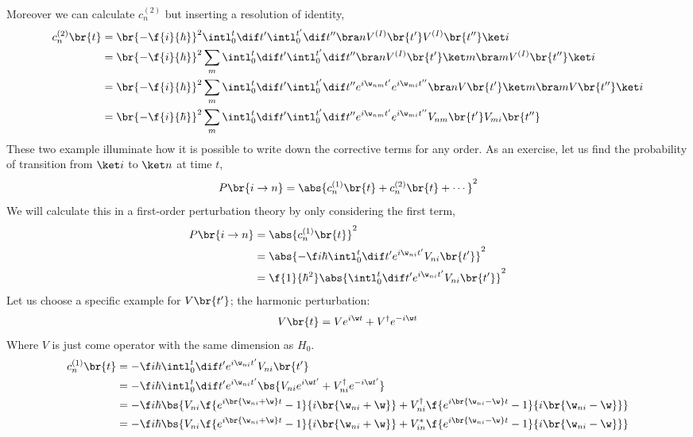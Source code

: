 \documentclass{article}
\begin{document}
Moreover we can calculate $c_n^{(2)}$ but inserting a resolution of identity,
\begin{align*}
    c_n^{(2)}\br{t}
    &= \br{-\f{i}{\hbar}}^2 \intl_{0}^{t} \dif t' \intl_{0}^{t'} \dif t'' \bra n V^{(I)}\br{t'} V^{(I)}\br{t''} \ket i  \\
    &= \br{-\f{i}{\hbar}}^2  \sum_{m}\intl_{0}^{t} \dif t' \intl_{0}^{t'} \dif t'' \bra n V^{(I)}\br{t'} \ket m \bra m V^{(I)}\br{t''} \ket i  \\
    &= \br{-\f{i}{\hbar}}^2  \sum_{m}\intl_{0}^{t} \dif t' \intl_{0}^{t'} \dif t'' e^{i \w_{nm} t'}e^{i \w_{mi} t''} \bra n V\br{t'} \ket m \bra m V\br{t''} \ket i  \\
    &= \br{-\f{i}{\hbar}}^2  \sum_{m}\intl_{0}^{t} \dif t' \intl_{0}^{t'} \dif t'' e^{i \w_{nm} t'}e^{i \w_{mi} t''} V_{nm}\br{t'}V_{mi}\br{t''}
\end{align*}
These two example illuminate how it is possible to write down the corrective terms for any order. As an exercise, let us find the probability of transition from $\ket i$ to $\ket n$ at time $t$,
\[ P\br{i \to n} = \abs{c_{n}^{(1)}\br{t} + c_{n}^{(2)}\br{t} + \cdots }^2 \]
We will calculate this in a first-order perturbation theory by only considering the first term,
\begin{align*}
P\br{i \to n}
&= \abs{c_{n}^{(1)}\br{t}}^2 \\
&= \abs{- \f i \hbar \intl_{0}^{t} \dif t' e^{i \w_{ni} t'}  V_{ni}\br{t'}}^2 \\
&= \f{1}{\hbar^2} \abs{\intl_{0}^{t} \dif t' e^{i \w_{ni} t'}  V_{ni}\br{t'}}^2
\end{align*}
Let us choose a specific example for $V\br{t'}$; the harmonic perturbation:
\[ V\br{t} = V e^{i \w t} + V^{\dagger} e^{-i \w t} \]
Where $V$ is just come operator with the same dimension as $H_0$.
\begin{align*}
    c_n^{(1)}\br{t}
    &= - \f i \hbar \intl_{0}^{t} \dif t' e^{i \w_{ni} t'} V_{ni}\br{t'} \\
    &= - \f i \hbar \intl_{0}^{t} \dif t' e^{i \w_{ni} t'} \bs{V_{ni} e^{i \w t'} + V^{\dagger}_{ni} e^{- i \w t'}} \\
    &= - \f i \hbar \bs{V_{ni} \f{e^{i \br{\w_{ni} + \w} t} - 1}{i\br{\w_{ni} + \w}} + V^{\dagger}_{ni} \f{e^{i \br{\w_{ni} - \w} t} - 1}{i\br{\w_{ni} - \w}}}\\
    &= - \f i \hbar \bs{V_{ni} \f{e^{i \br{\w_{ni} + \w} t} - 1}{i\br{\w_{ni} + \w}} + V^{*}_{in} \f{e^{i \br{\w_{ni} - \w} t} - 1}{i\br{\w_{ni} - \w}}}
\end{align*}
\end{document}
